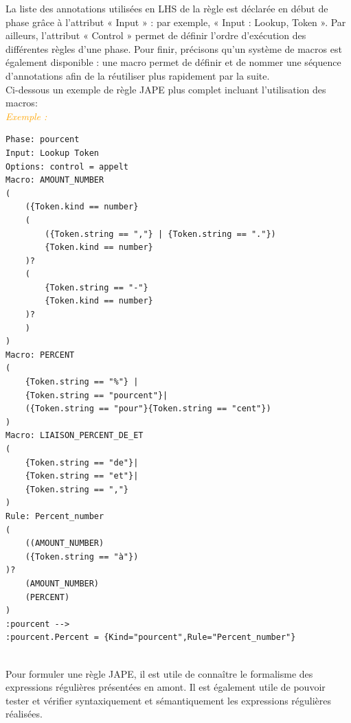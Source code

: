 \documentclass[a4paper, 11pt]{report}
\newenvironment{exemple}
    {
    \textit{\textcolor{orange}{
    Exemple : \\}}
    }
    {~\\
    }
\begin{document}
La liste des annotations utilisées en LHS de la règle est déclarée en début de phase grâce à l'attribut « Input » : par exemple, « Input : Lookup, Token ». Par ailleurs, l'attribut « Control » permet de définir l'ordre d'exécution des différentes règles d'une phase.
Pour finir, précisons qu'un système de macros est également disponible : une macro permet
de définir et de nommer une séquence d'annotations afin de la réutiliser plus rapidement par la suite.~\cite{SL10}\\
Ci-dessous un exemple de règle JAPE plus complet incluant l'utilisation des macros:\\
\begin{exemple}
\begin{verbatim}
Phase: pourcent
Input: Lookup Token
Options: control = appelt
Macro: AMOUNT_NUMBER
(
    ({Token.kind == number}
    (
        ({Token.string == ","} | {Token.string == "."})
        {Token.kind == number}
    )?
    (
        {Token.string == "-"}
        {Token.kind == number}
    )?
    )
)
Macro: PERCENT
(
    {Token.string == "%"} |
    {Token.string == "pourcent"}|
    ({Token.string == "pour"}{Token.string == "cent"})
)
Macro: LIAISON_PERCENT_DE_ET
(
    {Token.string == "de"}|
    {Token.string == "et"}|
    {Token.string == ","}
)
Rule: Percent_number
(
    ((AMOUNT_NUMBER)
    ({Token.string == "à"})
)?
    (AMOUNT_NUMBER)
    (PERCENT)
)
:pourcent -->
:pourcent.Percent = {Kind="pourcent",Rule="Percent_number"}
\end{verbatim}
\end{exemple}
Pour formuler une règle JAPE, il est utile de connaître le formalisme des expressions régulières présentées en amont. Il est également utile de pouvoir tester et vérifier syntaxiquement et sémantiquement les expressions régulières réalisées.
\newpage
\end{document}
